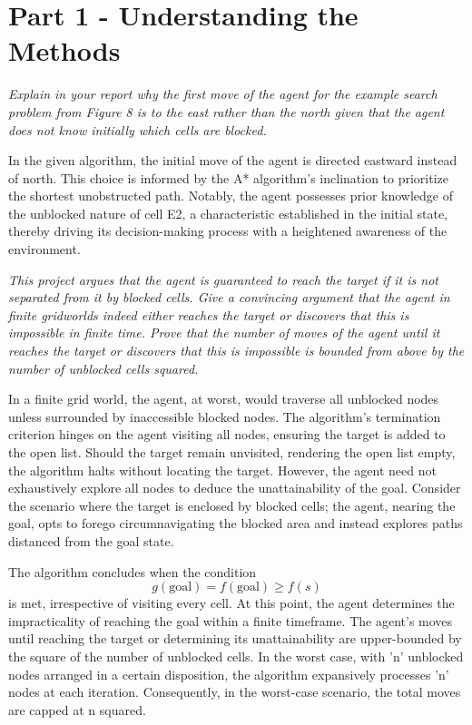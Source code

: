 \graphicspath{{Images/}}

\section{Part 1 - Understanding the Methods}

\textit{Explain in your report why the first move of the agent for the example search problem from Figure 8 is to the east rather
than the north given that the agent does not know initially which cells are blocked.}

In the given algorithm, the initial move of the agent is directed eastward instead of north. This choice is informed by the A* algorithm's inclination to prioritize the shortest unobstructed path. Notably, the agent possesses prior knowledge of the unblocked nature of cell E2, a characteristic established in the initial state, thereby driving its decision-making process with a heightened awareness of the environment.

\textit{This project argues that the agent is guaranteed to reach the target if it is not separated from it by blocked cells. Give a
convincing argument that the agent in finite gridworlds indeed either reaches the target or discovers that this is impossible
in finite time. Prove that the number of moves of the agent until it reaches the target or discovers that this is impossible is
bounded from above by the number of unblocked cells squared.}

In a finite grid world, the agent, at worst, would traverse all unblocked nodes unless surrounded by inaccessible blocked nodes. The algorithm's termination criterion hinges on the agent visiting all nodes, ensuring the target is added to the open list. Should the target remain unvisited, rendering the open list empty, the algorithm halts without locating the target. However, the agent need not exhaustively explore all nodes to deduce the unattainability of the goal. Consider the scenario where the target is enclosed by blocked cells; the agent, nearing the goal, opts to forego circumnavigating the blocked area and instead explores paths distanced from the goal state.

The algorithm concludes when the condition \[ g(\text{goal}) = f(\text{goal}) \geq f(s) \] is met, irrespective of visiting every cell. At this point, the agent determines the impracticality of reaching the goal within a finite timeframe. The agent's moves until reaching the target or determining its unattainability are upper-bounded by the square of the number of unblocked cells. In the worst case, with 'n' unblocked nodes arranged in a certain disposition, the algorithm expansively processes 'n' nodes at each iteration. Consequently, in the worst-case scenario, the total moves are capped at n squared.

